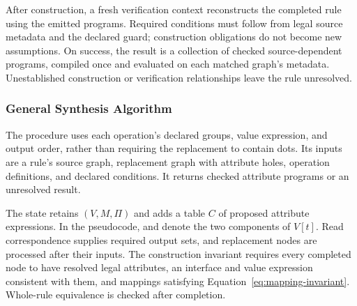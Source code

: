 After construction, a fresh verification context reconstructs the completed
rule using the emitted programs. Required conditions must follow from legal
source metadata and the declared guard; construction obligations do not
become new assumptions. On success, the result is a collection of checked
source-dependent programs, compiled once and evaluated on each matched
graph's metadata. Unestablished construction or verification relationships
leave the rule unresolved.

\FloatBarrier
\subsubsection{General Synthesis Algorithm}
\label{sec:synthesis-algorithm}
The procedure uses each operation's declared groups, value expression, and
output order, rather than requiring the replacement to contain dots. Its
inputs are a rule's source graph, replacement graph with attribute holes,
operation definitions, and declared conditions. It returns checked attribute
programs or an unresolved result.

The state retains $(V,M,\Pi)$ and adds a table $C$ of proposed attribute
expressions.  In the pseudocode,  and  denote the two
components of $V[t]$. Read correspondence supplies required output sets,
and replacement nodes are processed after their inputs. The construction
invariant requires every completed node to have resolved legal attributes,
an interface and value expression consistent with them, and mappings
satisfying Equation~\eqref{eq:mapping-invariant}. Whole-rule equivalence is
checked after completion.


